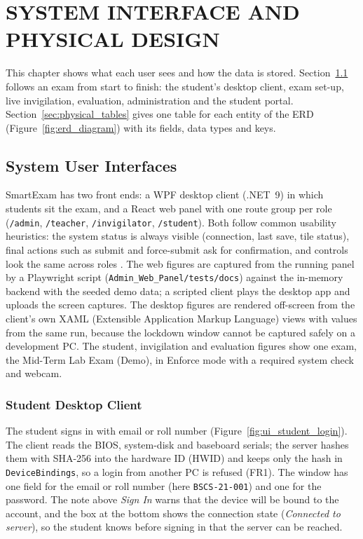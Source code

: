 \chapter{SYSTEM INTERFACE AND PHYSICAL DESIGN}
\label{chap:system_interface_physical_design}

This chapter shows what each user sees and how the data is stored. Section~\ref{sec:system_user_interfaces} follows an exam from start to finish: the student's desktop client, exam set-up, live invigilation, evaluation, administration and the student portal. Section~\ref{sec:physical_tables} gives one table for each entity of the ERD (Figure~\ref{fig:erd_diagram}) with its fields, data types and keys.

\section{System User Interfaces}
\label{sec:system_user_interfaces}
SmartExam has two front ends: a WPF desktop client (.NET~9) in which students sit the exam, and a React web panel with one route group per role (\texttt{/admin}, \texttt{/teacher}, \texttt{/invigilator}, \texttt{/student}). Both follow common usability heuristics: the system status is always visible (connection, last save, tile status), final actions such as submit and force-submit ask for confirmation, and controls look the same across roles \cite{nielsen_heuristics}. The web figures are captured from the running panel by a Playwright script (\texttt{Admin\_Web\_Panel/tests/docs}) against the in-memory backend with the seeded demo data; a scripted client plays the desktop app and uploads the screen captures. The desktop figures are rendered off-screen from the client's own XAML (Extensible Application Markup Language) views with values from the same run, because the lockdown window cannot be captured safely on a development PC. The student, invigilation and evaluation figures show one exam, the Mid-Term Lab Exam (Demo), in Enforce mode with a required system check and webcam.

\renewcommand{\topfraction}{0.9}\renewcommand{\bottomfraction}{0.9}
\renewcommand{\textfraction}{0.07}\renewcommand{\floatpagefraction}{0.8}
\subsection{Student Desktop Client}
The student signs in with email or roll number (Figure~\ref{fig:ui_student_login}). The client reads the BIOS, system-disk and baseboard serials; the server hashes them with SHA-256 into the hardware ID (HWID) and keeps only the hash in \texttt{DeviceBindings}, so a login from another PC is refused (FR1). The window has one field for the email or roll number (here \texttt{BSCS-21-001}) and one for the password. The note above \emph{Sign In} warns that the device will be bound to the account, and the box at the bottom shows the connection state (\emph{Connected to server}), so the student knows before signing in that the server can be reached.

